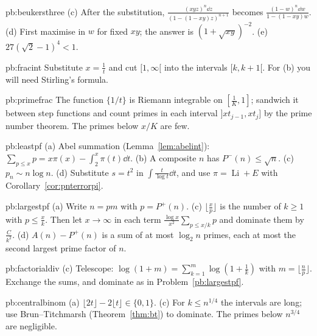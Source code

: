 \begin{hint}{pb:beukersthree}
(c) After the substitution, $\frac{(xyz)^n\dd z}{(1-(1-xy)z)^{n+1}}$ becomes $\frac{(1-w)^n\dd w}{1-(1-xy)w}$. (d) First maximise in $w$ for fixed $xy$; the
answer is $(1+\sqrt{xy})^{-2}$. (e) $27(\sqrt2-1)^4<1$.
\end{hint}

\begin{hint}{pb:fracint}
Substitute $x=\frac1t$ and cut $[1,\infty[$ into the intervals $[k,k+1[$. For (b) you will need Stirling's formula.
\end{hint}

\begin{hint}{pb:primefrac}
The function $\{1/t\}$ is Riemann integrable on $[\frac1K,1]$; sandwich it between step functions and count primes in each interval
$]xt_{j-1},xt_j]$ by the prime number theorem. The primes below $x/K$ are few.
\end{hint}

\begin{hint}{pb:leastpf}
(a) Abel summation (Lemma~\ref{lem:abelint}): $\sum_{p\le x}p=x\pi(x)-\int_2^x\pi(t)\dd t$. (b) A composite $n$ has $P^-(n)\le\sqrt n$. (c) $p_n\sim n\log n$. (d) Substitute $s=t^2$ in
$\int\frac t{\log t}\dd t$, and use $\pi=\operatorname{Li}+E$ with Corollary~\ref{cor:pnterrorpi}.
\end{hint}

\begin{hint}{pb:largestpf}
(a) Write $n=pm$ with $p=P^+(n)$. (c) $\lfloor\frac xp\rfloor$ is the number of $k\ge1$ with $p\le\frac xk$. Then let $x\to\infty$ in each term $\frac{\log x}{x^2}\sum_{p\le x/k}p$ and dominate them by $\frac C{k^2}$.
(d) $A(n)-P^+(n)$ is a sum of at most $\log_2n$ primes, each at most the second largest prime factor of $n$.
\end{hint}

\begin{hint}{pb:factorialdiv}
(c) Telescope: $\log(1+m)=\sum_{k=1}^m\log(1+\frac1k)$ with $m=\lfloor\frac np\rfloor$. Exchange the sums, and dominate as in Problem~\ref{pb:largestpf}.
\end{hint}

\begin{hint}{pb:centralbinom}
(a) $\lfloor2t\rfloor-2\lfloor t\rfloor\in\{0,1\}$. (c) For $k\le n^{1/4}$ the intervals are long; use Brun--Titchmarsh (Theorem~\ref{thm:bt}) to dominate. The primes below
$n^{3/4}$ are negligible.
\end{hint}

